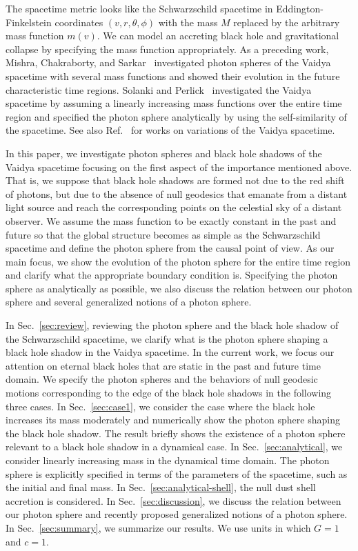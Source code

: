 \documentclass[prd,showpacs,preprintnumbers,groupedaddress,superscriptaddress,nofootinbib,11pt]{revtex4-1} %
\theoremstyle{newplain}
\begin{document}
The spacetime metric looks like the Schwarzschild spacetime in Eddington-Finkelstein coordinates $(v,r,\theta,\phi)$ with the mass $M$ replaced by the arbitrary mass function $m(v)$.
We can model an accreting black hole and gravitational collapse by specifying the mass function appropriately.
As a preceding work, Mishra, Chakraborty, and Sarkar~\cite{Mishra_2019} investigated photon spheres of the Vaidya spacetime with several mass functions and showed their evolution in the future characteristic time regions.
Solanki and Perlick~\cite{Solanki_2022} investigated the Vaidya spacetime by assuming a linearly increasing mass functions over the entire time region and specified the photon sphere analytically by using the self-similarity of the spacetime.
See also Ref.~\cite{Sarkar_2021} for works on variations of the Vaidya spacetime.
\par
In this paper, we investigate photon spheres and black hole shadows of the Vaidya spacetime focusing on the first aspect of the importance mentioned above.
That is, we suppose that black hole shadows are formed not due to the red shift of photons, but due to the absence of null geodesics that emanate from a distant light source and reach the corresponding points on the celestial sky of a distant observer.
We assume the mass function to be exactly constant in the past and future so that the global structure becomes as simple as the Schwarzschild spacetime and define the photon sphere from the causal point of view.
As our main focus, we show the evolution of the photon sphere for the entire time region and clarify what the appropriate boundary condition is.
Specifying the photon sphere as analytically as possible, we also discuss the relation between our photon sphere and several generalized notions of a photon sphere.
\par
In Sec.~\ref{sec:review}, reviewing the photon sphere and the black hole shadow of the Schwarzschild spacetime, we clarify what is the photon sphere shaping a black hole shadow in the Vaidya spacetime.
In the current work, we focus our attention on eternal black holes that are static in the past and future time domain.
We specify the photon spheres and the behaviors of null geodesic motions corresponding to the edge of the black hole shadows in the following three cases.
In Sec.~\ref{sec:case1}, we consider the case where the black hole increases its mass moderately and numerically show the photon sphere shaping the black hole shadow.
The result briefly shows the existence of a photon sphere relevant to a black hole shadow in a dynamical case.
In Sec.~\ref{sec:analytical}, we consider linearly increasing mass in the dynamical time domain.
The photon sphere is explicitly specified in terms of the parameters of the spacetime, such as the initial and final mass.
In Sec.~\ref{sec:analytical-shell}, the null dust shell accretion is considered.
In Sec.~\ref{sec:discussion}, we discuss the relation between our photon sphere and recently proposed generalized notions of a photon sphere.
In Sec.~\ref{sec:summary}, we summarize our results.
We use units in which $G=1$ and $c=1$. 
\end{document}
